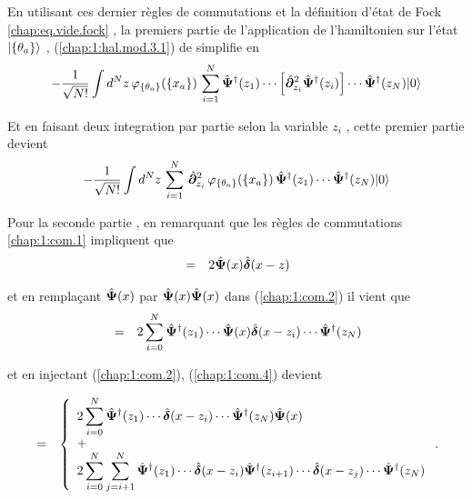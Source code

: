 En utilisant ces dernier règles de commutations et la définition d'état de Fock \eqref{chap:eq.vide.fock} , la premiers partie de l'application de l'hamiltonien sur l'état $\ket{\{\theta_a\}}$ , (\ref{chap:1:hal.mod.3.1}) de simplifie en
\begin{eqnarray}
     - \frac{1}{ \sqrt{N!}} \int d^N z \, \varphi_{\{ \theta_a \}} ( \{x_a\}) \,    \sum_{i=1}^N  \hat{\bm{\Psi}}^\dag(z_1) \cdots \left [\hat{\bm{\partial}}_{z_i}^2 \hat{\bm{\Psi}}^\dag(z_i)\right ] \cdots\hat{\bm{\Psi}}^\dag(z_N) \vert 0 \rangle
\end{eqnarray}

Et en faisant deux integration par partie selon la variable $z_i$ , cette premier partie devient
\begin{eqnarray}
     - \frac{1}{ \sqrt{N!}} \int d^N z \, \sum_{i=1}^N \, \hat{\bm{\partial}}_{z_i}^2\, \varphi_{\{ \theta_a \}} ( \{x_a\})  \,     \hat{\bm{\Psi}}^\dag(z_1)  \cdots\hat{\bm{\Psi}}^\dag(z_N) \vert 0 \rangle \label{chap:1:hal.mod.3.1.1}
\end{eqnarray}

Pour la seconde partie  , en remarquant que les règles de commutations  \eqref{chap:1:com.1} impliquent que
\begin{eqnarray}
    [ \operator{\Psi}(x) \operator{\Psi}(x),  \operator{\Psi}^\dag(z) ] & =& 2\operator{\Psi}(x)\operator{\delta}(x - z)\label{chap:1:com.3}
\end{eqnarray}

et en remplaçant $\hat{\bm{\Psi}}(x)$ par $\hat{\bm{\Psi}}(x)\hat{\bm{\Psi}}(x)$ dans  (\ref{chap:1:com.2}) il vient que
\begin{eqnarray}
    [ \operator{\Psi}(x)\operator{\Psi}(x),  \operator{\Psi}^\dag(z_1)\cdots \operator{\Psi}^\dag(z_N)  ]  &=&  2\sum_{i = 0}^{N} \operator{\Psi}^\dag(z_1) \cdots  \operator{\Psi}(x)\operator{\delta}(x-z_i) \cdots \operator{\Psi}^\dag(z_N) \label{chap:1:com.4}
\end{eqnarray}

et en injectant (\ref{chap:1:com.2}),  (\ref{chap:1:com.4}) devient

\begin{eqnarray}
    [ \operator{\Psi}(x)\operator{\Psi}(x),  \operator{\Psi}^\dag(z_1)\cdots \operator{\Psi}^\dag(z_N)  ]  &=& \left\{ \begin{array}{l} \displaystyle 2\sum_{i = 0}^{N} \operator{\Psi}^\dag(z_1) \cdots  \operator{\delta}(x-z_i) \cdots \operator{\Psi}^\dag(z_N) \operator{\Psi}(x) \\ + \\ \displaystyle 2\sum_{i = 0}^{N}\sum_{j = i+1}^{N} \operator{\Psi}^\dag(z_1) \cdots\operator{\delta}(x-z_i)\operator{\Psi}^\dag(z_{i+1})\cdots  \operator{\delta}(x-z_j) \cdots \operator{\Psi}^\dag(z_N) \end{array}\right. \label{chap:1:com.5}    .
\end{eqnarray}

